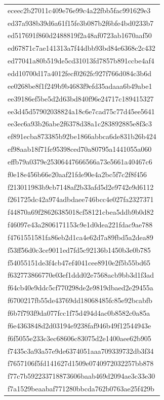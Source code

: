 \begin{tabular}{l}
eceec2b27011c409e76e99c4a22fbb5fac991629e3 \\
ed37a938b39d6a61f15fe3b087b2f6bfe4bd0233b7 \\
ed517691f860d2488819f2a48af0723ab1670aaf50 \\
ed67871c7ae141313a7f44dbb93bd84e6368c2c432 \\
ed77041a80b519de5cd31013fd7857b891ccbe4af4 \\
edd10700d17a4012fecf0262fc927f766d084c3b6d \\
ee0268be8f1f249b9b4683f9efd35adaaa6b49abe1 \\
ee39186ef5be5d2d63bd840f96e24717c189415327 \\
ee3d45d57902038824a18c6e7cad75c77d45ee5641 \\
ee3ec6a93b26abe2f6378d38a1c283892885e8f3c3 \\
ef891ecba873385b92be1866abbca6de831b26b424 \\
ef98aab18f71fe95398ced70a80795a1441055a060 \\
effb79a0379e25306447666566a73e5661a40467c6 \\
f0e18e456b66e20aaf21fde90e4a2bc5f7c2f8f456 \\
f213011983b9cb7148af2b33afd5d2e9742e9d6112 \\
f261725dc42a974adbdaee746bcc4e027fa2327371 \\
f44870a69f28626385018cf58121cbea5ddb9b0d82 \\
f46097e43a2806171153c9e1d0dea221fdac9ae788 \\
f4761551581fa86eb2d1ca4e62d7a89fbd5a2dea89 \\
f53ff56d0c3ce9011ed7fd5c92136b1450b3e0b785 \\
f54055151de3f4cb47ef4041cee8910e2f5b55bd65 \\
f632773866770e03ef1ddd02e7568acb9bb3d1f3ad \\
f64cb40e9ddc5cf770298de2e9819dbaed2e29455a \\
f6700217fb55de43769dd18068485fc85e92bcabfb \\
f6b7f793f9da077fcc1f75d494d4ac0b8582c0a85a \\
f6e4363848d2d03194e9238faf946b49f12544943e \\
f6f5055e233c3ec68606c83075d2e1400aee62b905 \\
f7435c3a93a57e9de6374051aaa709339732db3f34 \\
f7657106f5fd141627d1509e0740972032257bb878 \\
f77c7b592233718873606baab469d2094ae3c33e30 \\
f7a1529beaabaf771280bbcda762b0763ae25f429b \\

\end{tabular}

